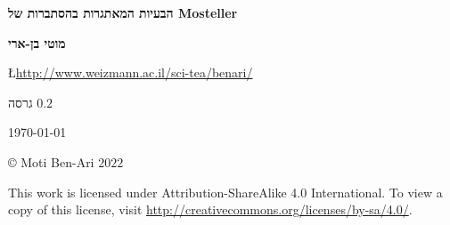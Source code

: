 


\thispagestyle{empty}

\begin{center}
\textbf{\LARGE הבעיות המאתגרות בהסתברות של Mosteller}

\bigskip
\bigskip
\bigskip

\textbf{\Large מוטי בן-ארי}

\bigskip

\L{\url{http://www.weizmann.ac.il/sci-tea/benari/}}

\bigskip
\bigskip

גרסה $0.2$

\bigskip

\today

\end{center}

\vfill

\begin{center}
\copyright{} Moti Ben-Ari $2022$
 \end{center}
 
\begin{small}
This work is licensed under Attribution-ShareAlike 4.0 International. To view a copy of this license, visit \url{http://creativecommons.org/licenses/by-sa/4.0/}.

%
%
%
%
%
%
\end{small}
\newpage


